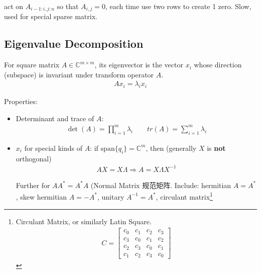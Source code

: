    act on $ A_{i-1:i,j:n} $ so that $ A_{i,j}=0 $, each time use two rows to create 1 zero. Slow, used for special sparse matrix.
    
\subsection{Eigenvalue Decomposition}
    For square matrix $ A \in\mathbb{C}^{m\times m}$, its eigenvector is the vector $ x_i $ whose direction (subspace) is invariant under transform operator $ A $.
    \begin{align}
        Ax_i =\lambda _ix_i
    \end{align}
    
    Properties:
\begin{itemize}[topsep=2pt,itemsep=0pt]
    \item Determinant and trace of $ A $:
    \begin{align}
        \det(A)=\prod_{i=1}^m\lambda _i\qquad tr(A)=\sum_{i=1}^m\lambda _i 
    \end{align}
    \item $ x_i $ for special kinds of $ A $: if $ \mathrm{span}\{q_i\}=\mathbb{C}^m  $, then (generally $ X $ is \textbf{not} orthogonal)
    \begin{align}
        AX=X\Lambda \Rightarrow  A=X\Lambda X^{-1} 
    \end{align}
    
    
    Further for $ AA^*=A^*A $ (Normal Matrix 规范矩阵. Include: hermitian $ A=A^* $, skew hermitian $A=-A^* $, unitary $ A^{-1}=A^* $, circulant matrix\footnote{Circulant Matrix, or similarly Latin Square.
    \begin{align}
        C=\begin{bmatrix}
            c_0&c_1&c_2&c_3\\
            c_3&c_0&c_1&c_2\\
            c_2&c_3&c_0&c_1\\
            c_1&c_2&c_3&c_0
        \end{bmatrix} 
    \end{align}
    
}
\end{itemize}
